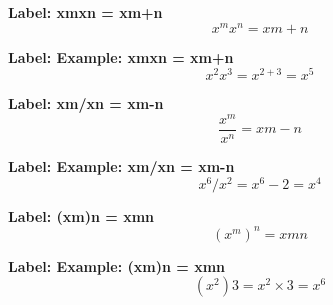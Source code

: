 \textbf{Label: xmxn = xm+n}
\[x^{m}x^{n} = xm+n\]

\textbf{Label: Example: xmxn = xm+n}
\[x^{2}x^{3}=x^{2+3}=x^{5}\]

\textbf{Label: xm/xn = xm-n}
\[\frac{x^{m}}{x^{n}} = xm-n\]

\textbf{Label: Example: xm/xn = xm-n}
\[x^{6}/x^{2} = x^{6}-2 = x^{4}\]

\textbf{Label: (xm)n = xmn}
\[(x^{m})^{n} = xmn\]

\textbf{Label: Example: (xm)n = xmn}
\[(x^{2})3 = x^{2}\times 3 = x^{6}\]

